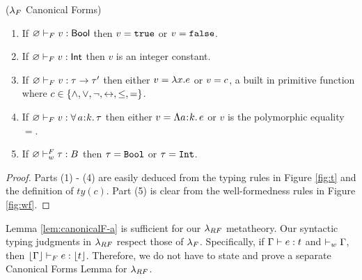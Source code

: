\begin{lemma}\label{lem:canonicalF-a}
    ($\lambda_{F}$ Canonical Forms) \begin{enumerate}
    \item If ${\varnothing} \vdash_F {v} : {{\sf Bool}}$ 
        then $v = {\tt true}$ or $v = {\tt false}$.
    \item If ${\varnothing} \vdash_F {v} : {{\sf Int}}$ 
        then $v$ is an integer constant.
    \item If ${\varnothing} \vdash_F {v} : {\tau \rightarrow \tau'}$ 
        then either $v = \lambda x. {e}$ or $v = c$, 
        a built in primitive function where 
        $c \in \{\wedge, \vee, \neg, \leftrightarrow,\leq,=\}$.
    \item If ${\varnothing} \vdash_F {v} : {\forall\, a\hspace{0.05em}{:}\hspace{0.05em} k.\, \tau}$ 
        then either $v = \Lambda a\hspace{0.05em}{:}\hspace{0.05em} k.\, e$ 
        or $v$ is the polymorphic equality $=$.
    \item If ${\varnothing} \vdash_w^F {\tau} : {B}$ 
        then $\tau = \texttt{Bool}$ or $\tau = \texttt{Int}$.
    \end{enumerate}
\end{lemma}
\begin{proof}
    Parts (1) - (4) are easily deduced from the \sysf typing rules 
    in Figure \ref{fig:t} and the definition of $ty(c)$. 
    Part (5) is clear from the well-formedness rules in Figure \ref{fig:wf}.
\end{proof}
Lemma \ref{lem:canonicalF-a} is sufficient for our $\lambda_{RF}$ metatheory.
Our syntactic typing judgments in $\lambda_{RF}$ respect those of $\lambda_{F}$.
Specifically, if ${\mathrm{\Gamma}} \vdash {\ensuremath{e}} : {t}$ and 
$\vdash_w {\mathrm{\Gamma}}$, then
${\lfloor{\mathrm{\Gamma}}\rfloor} \vdash_F {e} : {\lfloor{\ensuremath{t}}\rfloor}$.
Therefore, we do not have to state and 
prove a separate Canonical Forms Lemma for $\lambda_{RF}$.
